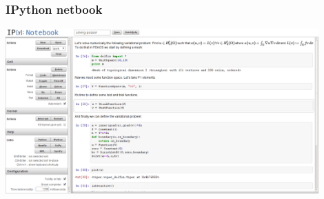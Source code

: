 \begin{frame}
    \frametitle{IPython netbook}
    \begin{center}
        \includegraphics[width=0.90\textwidth,height=0.8\textheight]{png/solving-poisson-notebook}
    \end{center}
\end{frame}

